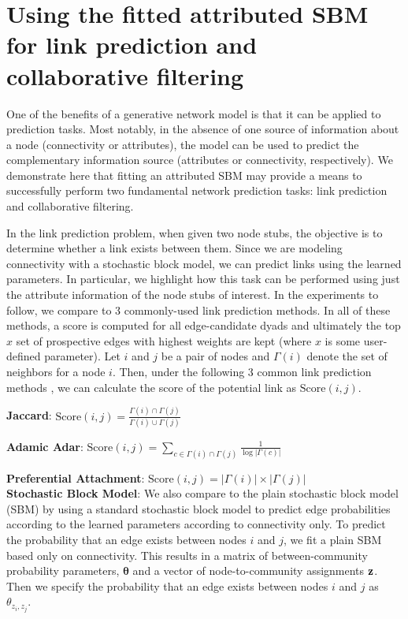 
\section{Using the fitted attributed SBM for link prediction and collaborative filtering}
One of the benefits of a generative network model is that it can be applied to prediction tasks. Most notably, in the absence of one source of information about a node (connectivity or attributes), the model can be used to predict the complementary information source (attributes or connectivity, respectively). We demonstrate here that fitting an attributed SBM may provide a means to successfully perform two fundamental network prediction tasks: link prediction and collaborative filtering. 

In the link prediction problem, when given two node stubs, the objective is to determine whether a link exists between them. Since we are modeling connectivity with a stochastic block model, we can predict links using the learned parameters.  In particular, we highlight how this task can be performed using just the attribute information of the node stubs of interest. In the experiments to follow, we compare to 3 commonly-used link prediction methods. In all of these methods, a score is computed for all edge-candidate dyads and ultimately the top $x$ set of prospective edges with highest weights are kept (where $x$ is some user-defined parameter). Let $i$ and $j$ be a pair of nodes and $\Gamma(i)$ denote the set of neighbors for a node $i$. Then, under the following 3 common  link prediction methods \cite{linkPredReview}, we can calculate the score of the potential link as $\text{Score}(i,j)$.

{\bf Jaccard}: $\text{Score}(i,j)= \frac{\Gamma(i) \cap \Gamma(j)}{\Gamma(i)\cup \Gamma(j)}$

{\bf Adamic Adar}: $\text{Score}(i,j)=\sum_{c \in \Gamma(i) \cap \Gamma(j)}\frac{1}{\log |\Gamma(c)|}$

{\bf Preferential Attachment}: $\text{Score}(i,j)=|\Gamma(i)|\times |\Gamma(j)|$\\

{\bf Stochastic Block Model}: We also compare to the plain stochastic block model (SBM) by using a standard stochastic block model to predict edge probabilities according to the learned parameters according to connectivity only. To predict the probability that an edge exists between nodes $i$ and $j$, we fit a plain SBM based only on connectivity. This results in a matrix of between-community probability parameters, ${\boldsymbol \theta}$ and a vector of node-to-community assignments ${\bf z}$. Then we specify the probability that an edge exists between nodes $i$ and $j$ as $\theta_{z_{i},z_{j}}$. 


